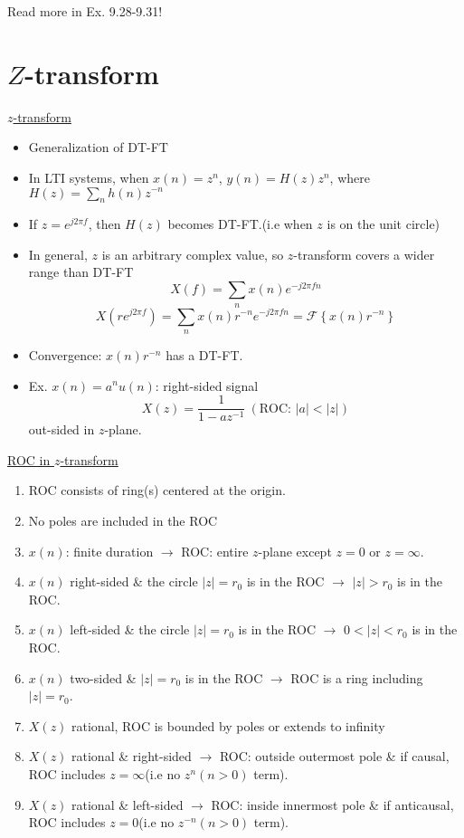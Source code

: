\documentclass{article}
\newcommand{\ft}[1]{\mathcal{F}\left\{#1\right\}}
\begin{document}
Read more in Ex. 9.28-9.31!
\section{$Z$-transform}
\underline{$z$-transform}
\begin{itemize}
    \item Generalization of DT-FT
    \item In LTI systems, when $x(n)=z^n$, $y(n)=H(z)z^n$, where $H(z)=\displaystyle{\sum_n{h(n)z^{-n}}}$
    \item If $z=e^{j2\pi f}$, then $H(z)$ becomes DT-FT.(i.e when $z$ is on the unit circle)
    \item In general, $z$ is an arbitrary complex value, so $z$-transform covers a wider range than DT-FT
    \[X(f)=\sum_n x(n)e^{-j2\pi fn}\]
    \[X(re^{j2\pi f})=\sum_n x(n)r^{-n}e^{-j2\pi fn}=\ft{x(n)r^{-n}}\]
    \item Convergence: $x(n)r^{-n}$ has a DT-FT.
    \item Ex. $x(n)=a^nu(n)$: right-sided signal
    \[X(z)=\frac{1}{1-az^{-1}}\:(\text{ROC: }|a|<|z|)\]
    out-sided in $z$-plane.
\end{itemize}
\underline{ROC in $z$-transform}
\begin{enumerate}
    \item ROC consists of ring(s) centered at the origin.
    \item No poles are included in the ROC
    \item $x(n)$: finite duration $\rightarrow$ ROC: entire $z$-plane except $z=0$ or $z=\infty$.
    \item $x(n)$ right-sided \& the circle $|z|=r_0$ is in the ROC $\rightarrow$ $|z| > r_0$ is in the ROC.
    \item $x(n)$ left-sided \& the circle $|z|=r_0$ is in the ROC $\rightarrow$ $0 < |z| < r_0$ is in the ROC.
    \item $x(n)$ two-sided \& $|z|=r_0$ is in the ROC $\rightarrow$ ROC is a ring including $|z|=r_0$.
    \item $X(z)$ rational, ROC is bounded by poles or extends to infinity
    \item $X(z)$ rational \& right-sided $\rightarrow$ ROC: outside outermost pole \& if causal, ROC includes $z=\infty$(i.e no $z^n(n>0)$ term).
    \item $X(z)$ rational \& left-sided $\rightarrow$ ROC: inside innermost pole \& if anticausal, ROC includes $z=0$(i.e no $z^{-n}(n>0)$ term).
\end{enumerate}
\end{document}
